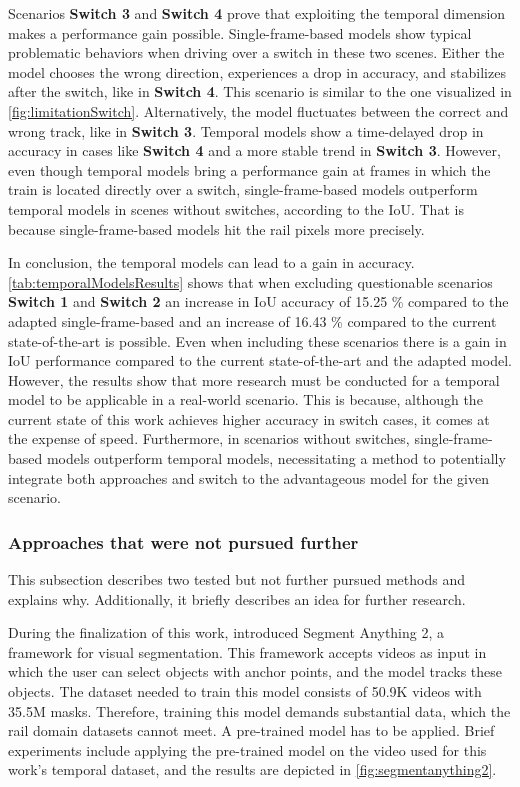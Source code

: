 Scenarios \textbf{Switch 3} and \textbf{Switch 4} prove that exploiting the temporal dimension makes a performance gain possible.
Single-frame-based models show typical problematic behaviors when driving over a switch in these two scenes.
Either the model chooses the wrong direction, experiences a drop in accuracy, and stabilizes after the switch, like in \textbf{Switch 4}.
This scenario is similar to the one visualized in \autoref{fig:limitationSwitch}.
Alternatively, the model fluctuates between the correct and wrong track, like in \textbf{Switch 3}.
Temporal models show a time-delayed drop in accuracy in cases like \textbf{Switch 4} and a more stable trend in \textbf{Switch 3}.
However, even though temporal models bring a performance gain at frames in which the train is located directly over a switch, single-frame-based models outperform temporal models in scenes without switches, according to the \ac{IoU}.
That is because single-frame-based models hit the rail pixels more precisely.

In conclusion, the temporal models can lead to a gain in accuracy.
\autoref{tab:temporalModelsResults} shows that when excluding questionable scenarios \textbf{Switch 1} and \textbf{Switch 2} an increase in \ac{IoU} accuracy of 15.25 \% compared to the adapted single-frame-based and an increase of 16.43 \% compared to the current state-of-the-art is possible.
Even when including these scenarios there is a gain in \ac{IoU} performance compared to the current state-of-the-art and the adapted model.
However, the results show that more research must be conducted for a temporal model to be applicable in a real-world scenario.
This is because, although the current state of this work achieves higher accuracy in switch cases, it comes at the expense of speed.
Furthermore, in scenarios without switches, single-frame-based models outperform temporal models, necessitating a method to potentially integrate both approaches and switch to the advantageous model for the given scenario.

\subsubsection{Approaches that were not pursued further}
\label{subsubsec:furtherApproachForOutlook}

This subsection describes two tested but not further pursued methods and explains why.
Additionally, it briefly describes an idea for further research.

During the finalization of this work, \cite{segmentAnything22024} introduced Segment Anything 2, a framework for visual segmentation.
This framework accepts videos as input in which the user can select objects with anchor points, and the model tracks these objects.
The dataset needed to train this model consists of 50.9K videos with 35.5M masks.
Therefore, training this model demands substantial data, which the rail domain datasets cannot meet.
A pre-trained model has to be applied.
Brief experiments include applying the pre-trained model on the video used for this work's temporal dataset, and the results are depicted in \autoref{fig:segmentanything2}.

